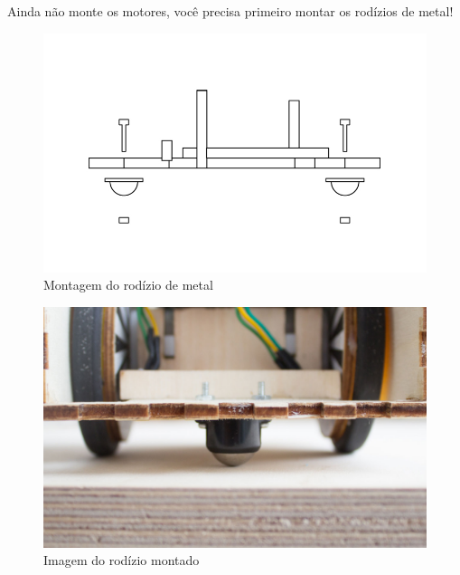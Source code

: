 \documentclass[paper=a4, fontsize=11pt]{scrartcl} %
\numberwithin{equation}{section} %
\numberwithin{figure}{section} %
\numberwithin{table}{section} %
\begin{document}
Ainda não monte os motores, você precisa primeiro montar os rodízios de metal!

\begin{figure}[h] %
  \centering
  \includegraphics[scale=0.12]{./imagens/ball-caster.jpg}
  \caption[ ]{Montagem do rodízio de metal }
  \label{fig:montagem rodizio}
\end{figure}

\begin{figure}[H] %
  \centering
  \includegraphics[scale=0.10]{./imagens/diy-docs-9.jpg}
  \caption[ ]{Imagem do rodízio montado }
  \label{fig:foto rodizio}
\end{figure}
\end{document}

